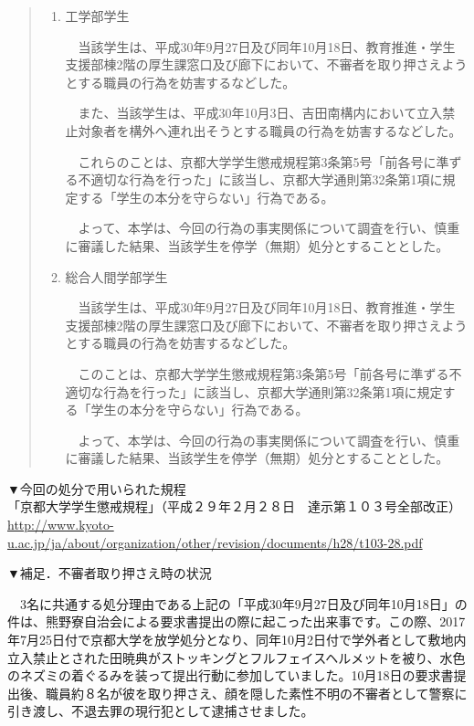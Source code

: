 {\begin{tcolorbox}[colback=white, colbacktitle=gray!30!white, coltitle=black, title=熊野寮生３名に対する無期停学処分の撤回を求める声明,breakable]
\begin{quotation}
\begin{enumerate}
        　よって、本学は、今回の行為の事実関係について調査を行い、慎重に審議した結果、当該学生を停学（無期）処分とすることとした。
        
        \item 工学部学生
        
        　当該学生は、平成30年9月27日及び同年10月18日、教育推進・学生支援部棟2階の厚生課窓口及び廊下において、不審者を取り押さえようとする職員の行為を妨害するなどした。
    
        　また、当該学生は、平成30年10月3日、吉田南構内において立入禁止対象者を構外へ連れ出そうとする職員の行為を妨害するなどした。
    
        　これらのことは、京都大学学生懲戒規程第3条第5号「前各号に準ずる不適切な行為を行った」に該当し、京都大学通則第32条第1項に規定する「学生の本分を守らない」行為である。
    
        　よって、本学は、今回の行為の事実関係について調査を行い、慎重に審議した結果、当該学生を停学（無期）処分とすることとした。
        
        \item 総合人間学部学生
    
        　当該学生は、平成30年9月27日及び同年10月18日、教育推進・学生支援部棟2階の厚生課窓口及び廊下において、不審者を取り押さえようとする職員の行為を妨害するなどした。
    
        　このことは、京都大学学生懲戒規程第3条第5号「前各号に準ずる不適切な行為を行った」に該当し、京都大学通則第32条第1項に規定する「学生の本分を守らない」行為である。
    
        　よって、本学は、今回の行為の事実関係について調査を行い、慎重に審議した結果、当該学生を停学（無期）処分とすることとした。
        
    
    \end{enumerate}
    \end{quotation}
    
    \vspace{5mm}
    \noindent ▼今回の処分で用いられた規程\\
    「京都大学学生懲戒規程」（平成２９年２月２８日　達示第１０３号全部改正）
    \url{http://www.kyoto-u.ac.jp/ja/about/organization/other/revision/documents/h28/t103-28.pdf}
    
    \vspace{5mm}
    \noindent ▼補足．不審者取り押さえ時の状況
    
    　3名に共通する処分理由である上記の「平成30年9月27日及び同年10月18日」の件は、熊野寮自治会による要求書提出の際に起こった出来事です。この際、2017年7月25日付で京都大学を放学処分となり、同年10月2日付で学外者として敷地内立入禁止とされた田暁典がストッキングとフルフェイスヘルメットを被り、水色のネズミの着ぐるみを装って提出行動に参加していました。10月18日の要求書提出後、職員約８名が彼を取り押さえ、顔を隠した素性不明の不審者として警察に引き渡し、不退去罪の現行犯として逮捕させました。
    

\end{tcolorbox}}
